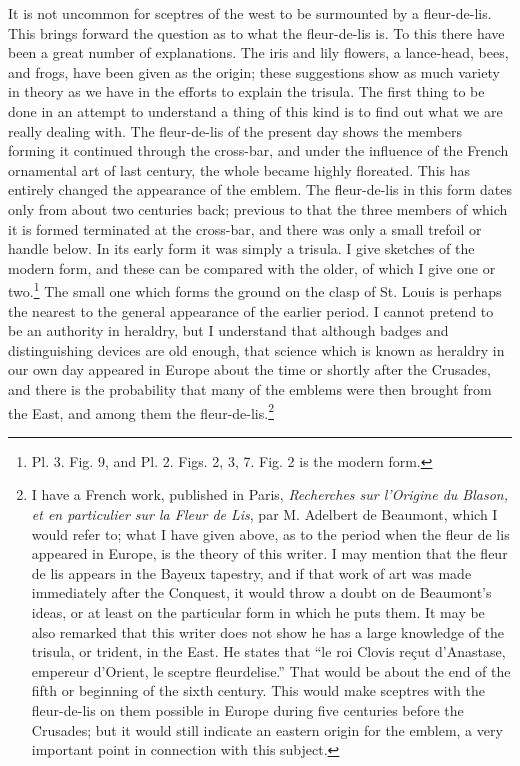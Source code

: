 \documentclass[a4paper, 11pt, oneside, english]{article}
\begin{document}
It is not uncommon for sceptres of the west to be surmounted by a fleur-de-lis. This brings forward the question as to what the fleur-de-lis is. To this there have been a great number of explanations. The iris and lily flowers, a lance-head, bees, and frogs, have been given as the origin; these suggestions show as much variety in theory as we have in the efforts to explain the trisula. The first thing to be done in an attempt to understand a thing of this kind is to find out what we are really dealing with. The fleur-de-lis of the present day shows the members forming it continued through the cross-bar, and under the influence of the French ornamental art of last century, the whole became highly floreated. This has entirely changed the appearance of the emblem. The fleur-de-lis in this form dates only from about two centuries back; previous to that the three members of which it is formed terminated at the cross-bar, and there was only a small trefoil or handle below. In its early form it was simply a trisula. I give sketches of the modern form, and these can be compared with the older, of which I give one or two.\footnote{Pl. 3. Fig. 9, and Pl. 2. Figs. 2, 3, 7. Fig. 2 is the modern form.} The small one which forms the ground on the clasp of St. Louis is perhaps the nearest to the general appearance of the earlier period. I cannot pretend to be an authority in heraldry, but I understand that although badges and distinguishing devices are old enough, that science which is known as heraldry in our own day appeared in Europe about the time or shortly after the Crusades, and there is the probability that many of the emblems were then brought from the East, and among them the fleur-de-lis.\footnote{I have a French work, published in Paris, \emph{Recherches sur l'Origine du Blason, et en particulier sur la Fleur de Lis}, par M. Adelbert de Beaumont, which I would refer to; what I have given above, as to the period when the fleur de lis appeared in Europe, is the theory of this writer. I may mention that the fleur de lis appears in the Bayeux tapestry, and if that work of art was made immediately after the Conquest, it would throw a doubt on de Beaumont's ideas, or at least on the particular form in which he puts them. It may be also remarked that this writer does not show he has a large knowledge of the trisula, or trident, in the East. He states that ``le roi Clovis reçut d'Anastase, empereur d'Orient, le sceptre fleurdelise.'' That would be about the end of the fifth or beginning of the sixth century. This would make sceptres with the fleur-de-lis on them possible in Europe during five centuries before the Crusades; but it would still indicate an eastern origin for the emblem, a very important point in connection with this subject.}
\end{document}
